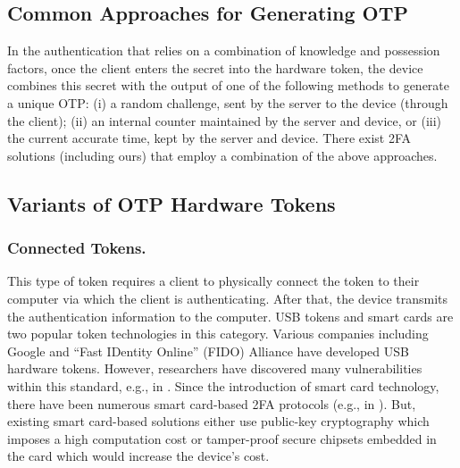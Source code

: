 \vspace{-5mm}
\subsection{Common Approaches for Generating OTP}
\vspace{-2mm}

In the authentication that relies on a combination of knowledge and possession factors, once the client enters the secret into the hardware token, the device combines this secret with the output of one of the following methods to generate a unique OTP:  (i) a random challenge, sent by the server to the device (through the client);  (ii) an internal counter maintained by the server and device, or (iii) the current accurate time, kept by the server and device. There exist 2FA solutions (including ours) that employ a combination of the above approaches. 

\vspace{-4mm}
\subsection{Variants of OTP Hardware Tokens}

\vspace{-2mm}
\subsubsection{Connected Tokens.}
This type of token requires a client to physically connect the token to their computer via which the client is authenticating. After that, the device transmits the authentication information to the computer. USB tokens and smart cards are two popular token technologies in this category.  Various companies including Google and  ``Fast IDentity Online'' (FIDO) Alliance have developed USB hardware tokens. However, researchers have discovered many vulnerabilities within this standard, e.g., in \cite{PanosMNPX17,ChangMSS17,LoutfiJ15,ndss/FengLP021}.  
%
Since the introduction of smart card technology, there have been numerous smart card-based 2FA protocols (e.g., in \cite{gupta2021machine,WangW18,radhakrishnan2022dependable,kim2009more}). But, existing smart card-based solutions either use public-key cryptography which imposes a high computation cost or tamper-proof secure chipsets embedded in the card which would increase the device's cost. 






